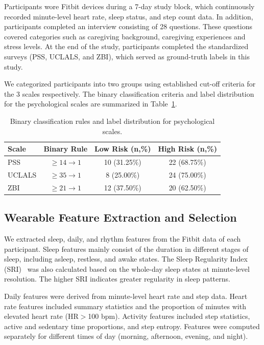 \documentclass[letterpaper, 10 pt, conference]{ieeeconf}  %
\begin{document}
Participants wore Fitbit devices during a 7-day study block, which continuously recorded minute-level heart rate, sleep status, and step count data. In addition, participants completed an interview consisting of 28 questions. These questions covered categories such as caregiving background, caregiving experiences and stress levels. At the end of the study, participants completed the standardized surveys (PSS\cite{pss}, UCLALS\cite{ucla}, and ZBI\cite{ZBI}), which served as ground-truth labels in this study.

We categorized participants into two groups using established cut-off criteria for the 3 scales respectively. The binary classification criteria and label distribution for the psychological scales are summarized in Table~\ref{tab:label_distribution}.

\begin{table}[t]
\centering
\caption{Binary classification rules and label distribution for psychological scales.}
\label{tab:label_distribution}
\begin{tabular}{lccc}
\hline
\textbf{Scale} & \textbf{Binary Rule} & \textbf{Low Risk (n,\%)} & \textbf{High Risk (n,\%)} \\
\hline
PSS\cite{pss} & $\geq 14 \rightarrow 1$ & 10 (31.25\%) & 22 (68.75\%) \\
UCLALS\cite{ucla} & $\geq 35 \rightarrow 1$ & 8 (25.00\%) & 24 (75.00\%) \\
ZBI\cite{ZBI} & $\geq 21 \rightarrow 1$ & 12 (37.50\%) & 20 (62.50\%) \\
\hline
\end{tabular}
\end{table}

\subsection{Wearable Feature Extraction and Selection}
We extracted sleep, daily, and rhythm features from the Fitbit data of each participant. Sleep features mainly consist of the duration in different stages of sleep, including asleep, restless, and awake states. The Sleep Regularity Index (SRI)~\cite{sri} was also calculated based on the whole-day sleep states at minute-level resolution. The higher SRI indicates greater regularity in sleep patterns.

Daily features were derived from minute-level heart rate and step data. Heart rate features included summary statistics and the proportion of minutes with elevated heart rate (HR$>$100 bpm). Activity features included step statistics, active and sedentary time proportions, and step entropy. Features were computed separately for different times of day (morning, afternoon, evening, and night).
\end{document}
